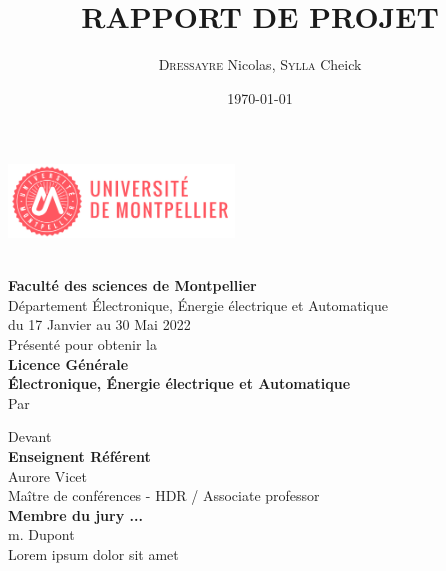 \documentclass[a4paper]{report}
\title{\LARGE{RAPPORT DE PROJET}}
\author{\textsc{Dressayre} Nicolas, \textsc{Sylla} Cheick}
\date{\today}
\begin{document}
	
	
		\enlargethispage{2cm}
		
		\begin{center}
			\includegraphics[width=6cm]{logo_um.png}
			
			\vspace*{3cm}
			\Huge{\@title}\\
			
			
			\large{\textbf{Faculté des sciences de Montpellier}}\\
			Département Électronique, Énergie électrique et Automatique\\
			du 17 Janvier au 30 Mai 2022 \\
			
			\vspace*{1cm}
			\large{Présenté pour obtenir la}\\
			\vspace*{0.5cm}
			\large{\textbf{Licence Générale}}\\
			\large{\textbf{Électronique, Énergie électrique et Automatique}}\\
			
			\vspace*{1cm}
			\large{Par}\\
			\vspace*{0.5cm}
			\large{\@author} 
			
			\vspace*{1cm}
			\large{Devant}\\
			
			\vspace*{1cm}
			\large{\textbf{Enseignent Référent}}\\
			\large{Aurore Vicet}\\
			Maître de conférences - HDR / Associate professor\\
			
			\vspace*{1cm}
			\large{\textbf{Membre du jury ...}}\\
			\large{m. Dupont}\\
			Lorem ipsum dolor sit amet\\
			

\end{center}
\end{document}
